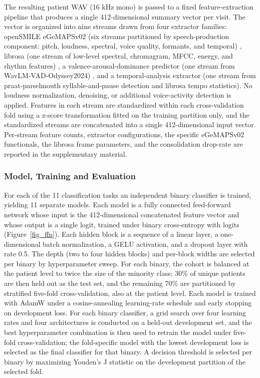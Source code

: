 \documentclass[utf8]{FrontiersinHarvard} %
\begin{document}
The resulting patient WAV (16 kHz mono) is passed to a fixed feature-extraction pipeline that produces a single 412-dimensional summary vector per visit. The vector is organized into nine streams drawn from four extractor families: openSMILE eGeMAPSv02 (six streams partitioned by speech-production component: pitch, loudness, spectral, voice quality, formants, and temporal) \citep{eyben-egemaps-2016,eyben-opensmile-2010}, librosa (one stream of low-level spectral, chromagram, MFCC, energy, and rhythm features) \citep{librosa-mcfee-2015}, a valence-arousal-dominance predictor (one stream from WavLM-VAD-Odyssey2024) \citep{wavlm-vad-odyssey-2024}, and a temporal-analysis extractor (one stream from praat-parselmouth syllable-and-pause detection and librosa tempo statistics). No loudness normalization, denoising, or additional voice-activity detection is applied. Features in each stream are standardized within each cross-validation fold using a z-score transformation fitted on the training partition only, and the standardized streams are concatenated into a single 412-dimensional input vector. Per-stream feature counts, extractor configurations, the specific eGeMAPSv02 functionals, the librosa frame parameters, and the consolidation drop-rate are reported in the supplementary material.

\subsubsection{Model, Training and Evaluation}
\label{sec:methods-architecture}
\label{sec:methods-training}
\label{sec:methods-evaluation}

For each of the 11 classification tasks an independent binary classifier is trained, yielding 11 separate models. Each model is a fully connected feed-forward network whose input is the 412-dimensional concatenated feature vector and whose output is a single logit, trained under binary cross-entropy with logits (Figure~\ref{fig_ffn}). Each hidden block is a sequence of a linear layer, a one-dimensional batch normalization, a GELU activation, and a dropout layer with rate 0.5. The depth (two to four hidden blocks) and per-block widths are selected per binary by hyperparameter sweep. For each binary, the cohort is balanced at the patient level to twice the size of the minority class; 30\% of unique patients are then held out as the test set, and the remaining 70\% are partitioned by stratified five-fold cross-validation, also at the patient level. Each model is trained with AdamW \citep{loshchilov-adamw-2019} under a cosine-annealing learning-rate schedule \citep{loshchilov-sgdr-2017} and early stopping on development loss. For each binary classifier, a grid search over four learning rates and four architectures is conducted on a held-out development set, and the best hyperparameter combination is then used to retrain the model under five-fold cross-validation; the fold-specific model with the lowest development loss is selected as the final classifier for that binary. A decision threshold is selected per binary by maximizing Youden's J statistic \citep{youden-1950} on the development partition of the selected fold.
\end{document}
